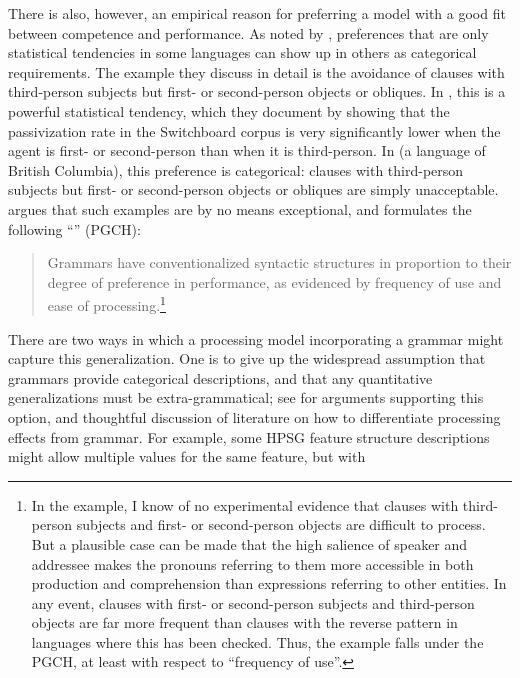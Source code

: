 \documentclass[output=paper
 	        ,biblatex
                ,babelshorthands
                ,newtxmath
                ,draftmode
                ,colorlinks, citecolor=brown
]{langscibook}
\begin{document}
\largerpage[-1] 
There is also, however, an empirical reason for preferring a model with a good fit
between competence and performance.  As noted by \citet{BresnanEtAl2001}, preferences that are only
statistical tendencies in some languages can show up in others as categorical requirements.  The
example they discuss in detail is the avoidance of clauses with third-person subjects but first- or
second-person objects or obliques. In , this is a powerful statistical tendency, which
they document by showing that the passivization rate in the Switchboard corpus is very significantly
lower when the agent is first- or second-person than when it is third-person.  In  (a
 language of British Columbia), this preference is categorical: clauses with
third-person subjects but first- or second-person objects or obliques are simply unacceptable.
\citet{Hawkins2004a-u,Hawkins2014} argues that such examples are by no means exceptional, and
formulates the following ``'' (PGCH):
\begin{quote}
Grammars  have  conventionalized  syntactic  structures  in  proportion   to their degree of
preference in performance, as evidenced by frequency of use and ease of processing.\footnote{In the
  \citeauthor{BresnanEtAl2001} example, I know of no experimental evidence that clauses with
  third-person subjects and first- or second-person objects are difficult to process.  But a
  plausible case can be made that the high salience of speaker and addressee makes the pronouns
  referring to them more accessible in both production and comprehension than expressions referring
  to other entities.  In any event, clauses with first- or second-person subjects and third-person
  objects are far more frequent than clauses with the reverse pattern in languages where this has
  been checked.  Thus, the \citeauthor{BresnanEtAl2001} example falls under the PGCH, at least with
  respect to ``frequency of use''.}
\end{quote}
\largerpage[-1]
There are two ways in which a processing model incorporating a grammar might capture this
generalization.  One is to give up the widespread assumption that grammars provide categorical
descriptions, and that any quantitative generalizations must be extra-grammatical; see
\citet{Francis2021} for arguments supporting this option, and thoughtful discussion of literature
on how to differentiate processing effects from grammar.  For example, some HPSG feature
structure descriptions might allow multiple values for the same feature, but with
\end{document}
